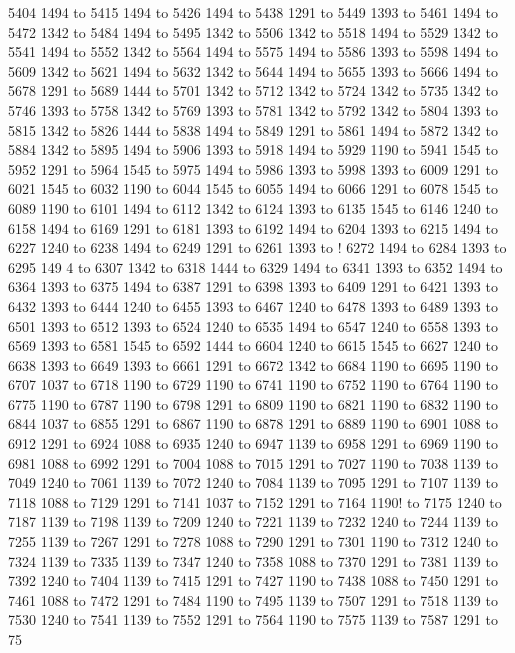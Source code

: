  5404 1494 to 5415 1494 to 5426 1494 to 5438 1291 to 5449 1393 to 5461 1494 to 5472 1342 to 5484 1494 to 5495 1342 to 5506 1342 to 5518 1494 to 5529 1342 to 5541 1494 to 5552 1342 to 5564 1494 to 5575 1494 to 5586 1393 to 5598 1494 to 5609 1342 to 5621 1494 to 5632 1342 to 5644 1494 to 5655 1393 to 5666 1494 to 5678 1291 to 5689 1444 to 5701 1342 to 5712 1342 to 5724 1342 to 5735 1342 to 5746 1393 to 5758 1342 to 5769 1393 to 5781 1342 to 5792 1342 to 5804 1393 to 5815 1342 to 5826 1444 to 5838 1494 to 5849 1291 to 5861 1494 to 5872 1342 to 5884 1342 to 5895 1494 to 5906 1393 to 5918 1494 to 5929 1190 to 5941 1545 to 5952 1291 to 5964 1545 to 5975 1494 to 5986 1393 to 5998 1393 to 6009 1291 to 6021 1545 to 6032 1190 to 6044 1545 to 6055 1494 to 6066 1291 to 6078 1545 to 6089 1190 to 6101 1494 to 6112 1342 to 6124 1393 to 6135 1545 to 6146 1240 to 6158 1494 to 6169 1291 to 6181 1393 to 6192 1494 to 6204 1393 to 6215 1494 to 6227 1240 to 6238 1494 to 6249 1291 to 6261 1393 to !
6272 1494 to 6284 1393 to 6295 149
4 to 6307 1342 to 6318 1444 to 6329 1494 to 6341 1393 to 6352 1494 to 6364 1393 to 6375 1494 to 6387 1291 to 6398 1393 to 6409 1291 to 6421 1393 to 6432 1393 to 6444 1240 to 6455 1393 to 6467 1240 to 6478 1393 to 6489 1393 to 6501 1393 to 6512 1393 to 6524 1240 to 6535 1494 to 6547 1240 to 6558 1393 to 6569 1393 to 6581 1545 to 6592 1444 to 6604 1240 to 6615 1545 to 6627 1240 to 6638 1393 to 6649 1393 to 6661 1291 to 6672 1342 to 6684 1190 to 6695 1190 to 6707 1037 to 6718 1190 to 6729 1190 to 6741 1190 to 6752 1190 to 6764 1190 to 6775 1190 to 6787 1190 to 6798 1291 to 6809 1190 to 6821 1190 to 6832 1190 to 6844 1037 to 6855 1291 to 6867 1190 to 6878 1291 to 6889 1190 to 6901 1088 to 6912 1291 to 6924 1088 to 6935 1240 to 6947 1139 to 6958 1291 to 6969 1190 to 6981 1088 to 6992 1291 to 7004 1088 to 7015 1291 to 7027 1190 to 7038 1139 to 7049 1240 to 7061 1139 to 7072 1240 to 7084 1139 to 7095 1291 to 7107 1139 to 7118 1088 to 7129 1291 to 7141 1037 to 7152 1291 to 7164 1190!
 to 7175 1240 to 7187 1139 to 7198
 1139 to 7209 1240 to 7221 1139 to 7232 1240 to 7244 1139 to 7255 1139 to 7267 1291 to 7278 1088 to 7290 1291 to 7301 1190 to 7312 1240 to 7324 1139 to 7335 1139 to 7347 1240 to 7358 1088 to 7370 1291 to 7381 1139 to 7392 1240 to 7404 1139 to 7415 1291 to 7427 1190 to 7438 1088 to 7450 1291 to 7461 1088 to 7472 1291 to 7484 1190 to 7495 1139 to 7507 1291 to 7518 1139 to 7530 1240 to 7541 1139 to 7552 1291 to 7564 1190 to 7575 1139 to 7587 1291 to 75
